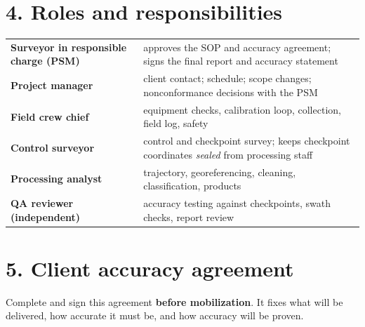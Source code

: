 \section*{4. Roles and responsibilities}
\begin{center}\small
\renewcommand{\arraystretch}{1.2}
\begin{tabularx}{\linewidth}{>{\bfseries}p{3.6cm}X}\toprule
Surveyor in responsible charge (PSM) & approves the SOP and accuracy agreement; signs the final report and accuracy statement\\
Project manager & client contact; schedule; scope changes; nonconformance decisions with the PSM\\
Field crew chief & equipment checks, calibration loop, collection, field log, safety\\
Control surveyor & control and checkpoint survey; keeps checkpoint coordinates \emph{sealed} from processing staff\\
Processing analyst & trajectory, georeferencing, cleaning, classification, products\\
QA reviewer (independent) & accuracy testing against checkpoints, swath checks, report review\\\bottomrule
\end{tabularx}\end{center}

\section*{5. Client accuracy agreement}
Complete and sign this agreement \textbf{before mobilization}. It fixes what will be delivered, how accurate it must be, and how accuracy will be proven.

